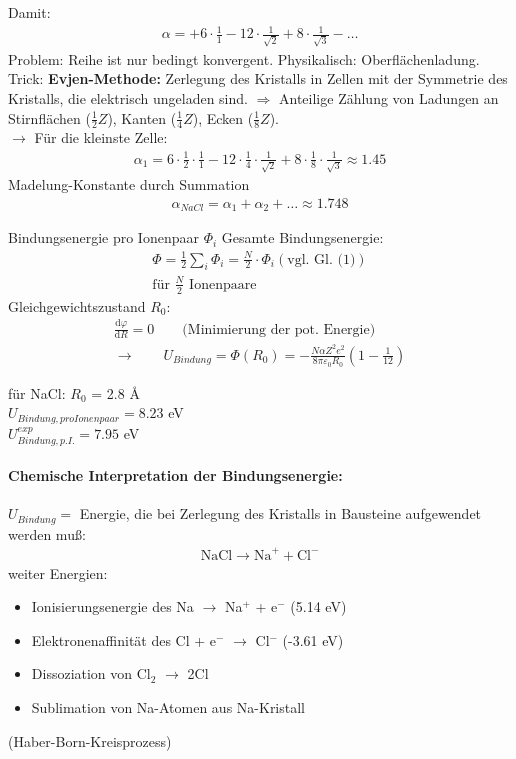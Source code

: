 	Damit:
	\begin{align}
		\alpha = +6 \cdot \frac{1}{1} - 12 \cdot \frac{1}{\sqrt{2}} + 8 \cdot \frac{1}{\sqrt{3}} - \dots
	\end{align}
	Problem: Reihe ist nur bedingt konvergent. Physikalisch: Oberflächenladung.\\
	Trick: \textbf{Evjen-Methode:} Zerlegung des Kristalls in Zellen mit der Symmetrie des Kristalls, die elektrisch ungeladen sind.
	$\Rightarrow$ Anteilige Zählung von Ladungen an Stirnflächen ($\frac{1}{2}Z$), Kanten ($\frac{1}{4}Z$), Ecken ($\frac{1}{8}Z$).\\
	$\rightarrow$ Für die kleinste Zelle:
	\begin{align}
		\alpha_1 = 6 \cdot \frac{1}{2} \cdot \frac{1}{1}  - 12 \cdot \frac{1}{4} \cdot \frac{1}{\sqrt{2}} + 8 \cdot \frac{1}{8} \cdot \frac{1}{\sqrt{3}} \approx 1.45
	\end{align}
	Madelung-Konstante durch Summation
	\begin{align*}
		\alpha_{NaCl} = \alpha_1 + \alpha_2 + \dots \approx 1.748
	\end{align*}

	Bindungsenergie pro Ionenpaar $\Phi_i$
	Gesamte Bindungsenergie: 
	\begin{align} 
		\Phi = \frac{1}{2} \sum_i \Phi_i = \frac{N}{2} \cdot \Phi_i (\text{vgl. Gl. (1)})  \\
		\text{für }\frac{N}{2}\text{ Ionenpaare} \nonumber
	\end{align}
	Gleichgewichtszustand $R_0$:
	\begin{align*}
		\frac{\mathrm{d} \varphi}{\mathrm{d} R} = 0 \qquad \text{(Minimierung der pot. Energie)} \\
		\rightarrow \qquad U_{Bindung} = \Phi (R_0) = - \frac{N \alpha Z^2 e^2}{8 \pi \varepsilon_0 R_0} \left(1- \frac{1}{12} \right)
	\end{align*}

	für NaCl: $R_0$ = 2.8 \AA\\
	$U_{Bindung, pro Ionenpaar} = 8.23$ eV\\
	$U_{Bindung, p.I.}^{exp} = 7.95$ eV \\

\paragraph{Chemische Interpretation der Bindungsenergie:}
	$U_{Bindung} =$ Energie, die bei Zerlegung des Kristalls in Bausteine aufgewendet werden muß:
	\begin{align*}
		\text{NaCl} \rightarrow \text{Na}^+ + \text{Cl}^-
	\end{align*}
	weiter Energien:
	\begin{itemize}
		\item Ionisierungsenergie des Na $\rightarrow$ Na$^+$ + e$^-$ (5.14 eV)
		\item Elektronenaffinität des Cl + e$^-$ $\rightarrow$ Cl$^-$ (-3.61 eV)
		\item Dissoziation von Cl$_2$ $\rightarrow$ 2Cl
		\item Sublimation von Na-Atomen aus Na-Kristall
	\end{itemize}
(Haber-Born-Kreisprozess)

